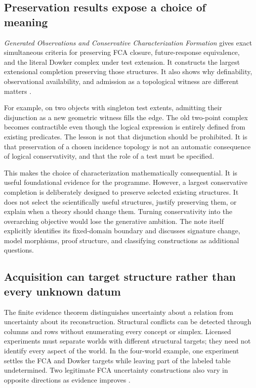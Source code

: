 \documentclass[11pt]{article}
\begin{document}
\subsection{Preservation results expose a choice of meaning}
\label{sec:generated-result}

\emph{Generated Observations and Conservative Characterization Formation} gives exact simultaneous criteria for preserving FCA closure, future-response equivalence, and the literal Dowker complex under test extension. It constructs the largest extensional completion preserving those structures. It also shows why definability, observational availability, and admission as a topological witness are different matters \cite[Three extension criteria, Largest simultaneous completion, and Theory extension beyond a fixed incidence domain]{Generated}.

For example, on two objects with singleton test extents, admitting their disjunction as a new geometric witness fills the edge. The old two-point complex becomes contractible even though the logical expression is entirely defined from existing predicates. The lesson is not that disjunction should be prohibited. It is that preservation of a chosen incidence topology is not an automatic consequence of logical conservativity, and that the role of a test must be specified.

This makes the choice of characterization mathematically consequential. It is useful foundational evidence for the programme. However, a largest conservative completion is deliberately designed to preserve selected existing structures. It does not select the scientifically useful structures, justify preserving them, or explain when a theory should change them. Turning conservativity into the overarching objective would lose the generative ambition. The note itself explicitly identifies its fixed-domain boundary and discusses signature change, model morphisms, proof structure, and classifying constructions as additional questions.

\subsection{Acquisition can target structure rather than every unknown datum}
\label{sec:evidence-result}

The finite evidence theorem distinguishes uncertainty about a relation from uncertainty about its reconstruction. Structural conflicts can be detected through columns and rows without enumerating every concept or simplex. Licensed experiments must separate worlds with different structural targets; they need not identify every aspect of the world. In the four-world example, one experiment settles the FCA and Dowker targets while leaving part of the labeled table undetermined. Two legitimate FCA uncertainty constructions also vary in opposite directions as evidence improves \cite[Exact finite target identification; Structural certificates and the cost of useful queries; Two-sided closure reconstruction and refinement; the four-world example]{Evidence}.
\end{document}
